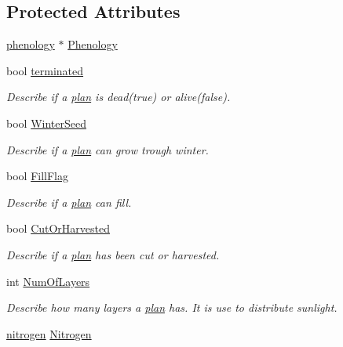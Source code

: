 \subsection*{Protected Attributes}
\begin{DoxyCompactItemize}
\item 
\hyperlink{classphenology}{phenology} $\ast$ \hyperlink{classcrop_a38f05d3f77cfc67ff755eb8c0d79e301}{Phenology}
\item 
bool \hyperlink{classcrop_af94e599e6f05fae15099673485d28e88}{terminated}
\begin{DoxyCompactList}\small\item\em Describe if a \hyperlink{classplan}{plan} is dead(true) or alive(false). \item\end{DoxyCompactList}\item 
bool \hyperlink{classcrop_a7b2a38633965734c3298a4da248c6d53}{WinterSeed}
\begin{DoxyCompactList}\small\item\em Describe if a \hyperlink{classplan}{plan} can grow trough winter. \item\end{DoxyCompactList}\item 
bool \hyperlink{classcrop_ac85050f76b5416047499dcdc854d6f41}{FillFlag}
\begin{DoxyCompactList}\small\item\em Describe if a \hyperlink{classplan}{plan} can fill. \item\end{DoxyCompactList}\item 
bool \hyperlink{classcrop_a8e7d3a42d931c8c1d95f92bb2669f2ef}{CutOrHarvested}
\begin{DoxyCompactList}\small\item\em Describe if a \hyperlink{classplan}{plan} has been cut or harvested. \item\end{DoxyCompactList}\item 
int \hyperlink{classcrop_add8f384e82643550fa78abd7382abc4f}{NumOfLayers}
\begin{DoxyCompactList}\small\item\em Describe how many layers a \hyperlink{classplan}{plan} has. It is use to distribute sunlight. \item\end{DoxyCompactList}\item 
\hyperlink{classnitrogen}{nitrogen} \hyperlink{classcrop_adabbdde8753e5ae0ecd238e221429d88}{Nitrogen}

\end{DoxyCompactItemize}

